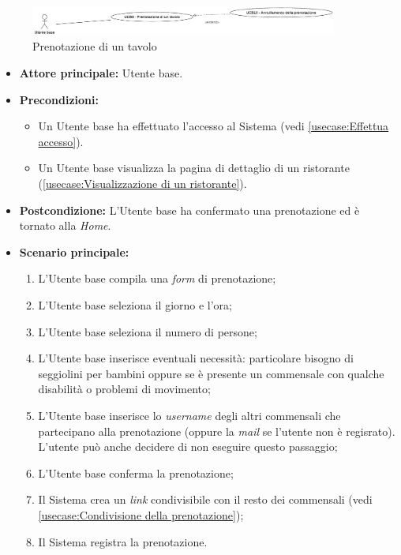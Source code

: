 \label{usecase:Prenotazione di un tavolo}

\begin{figure}[h]
	\centering
	\includegraphics[width=0.9\textwidth]{./uml/UCB8-10.png} 
	\caption{Prenotazione di un tavolo}
	\label{fig:UCB8-10}
  \end{figure}

\begin{itemize}
	\item \textbf{Attore principale:} Utente base.
	\item \textbf{Precondizioni:}
	      \begin{itemize}
		      \item Un Utente base ha effettuato l'accesso al Sistema (vedi \autoref{usecase:Effettua accesso}).
		      \item Un Utente base visualizza la pagina di dettaglio di un ristorante (\autoref{usecase:Visualizzazione di un ristorante}).
	      \end{itemize}
	\item \textbf{Postcondizione:} L'Utente base ha confermato una prenotazione ed è tornato alla \textit{Home}.


	\item \textbf{Scenario principale:}
	      \begin{enumerate}
		      \item L'Utente base compila una \textit{form} di prenotazione;
		      \item L'Utente base seleziona il giorno e l'ora;
		      \item L'Utente base seleziona il numero di persone;
		      \item L'Utente base inserisce eventuali necessità: particolare bisogno di seggiolini per bambini oppure se è presente un commensale con qualche disabilità o problemi di movimento;
		      \item L'Utente base inserisce lo \textit{username} degli altri commensali che partecipano alla prenotazione (oppure la \textit{mail} se l'utente non è regisrato).
		            L'utente può anche decidere di non eseguire questo passaggio;
		      \item L'Utente base conferma la prenotazione;
		      \item Il Sistema crea un \textit{link} condivisibile con il resto dei commensali (vedi \autoref{usecase:Condivisione della prenotazione});
		      \item Il Sistema registra la prenotazione.


\end{enumerate}
\end{itemize}
